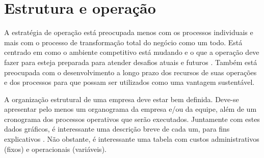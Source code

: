 \chapter{Estrutura e operação} 

A estratégia de operação está preocupada menos com os processos individuais
e mais com o processo de transformação total do negócio como um todo.  Está
centrado em como o ambiente competitivo está mudando e o que a operação deve
fazer para esteja preparada para atender desafios atuais e futuros
\cite{nigel2009operations}.  Também está preocupada com o desenvolvimento
a longo prazo dos recursos de suas operações e dos processos para que possam
ser utilizados como uma vantagem sustentável.

A organização estrutural de uma empresa deve estar bem definida. Deve-se 
apresentar pelo menos um organograma da empresa e/ou da equipe, além de um 
cronograma dos processos operativos que serão executados. Juntamente com 
estes dados gráficos, é interessante uma descrição breve de cada um, para 
fins explicativos \cite{slack2002administração}. Não obstante, é interessante 
uma tabela com custos administrativos (fixos) e operacionais (variáveis).

